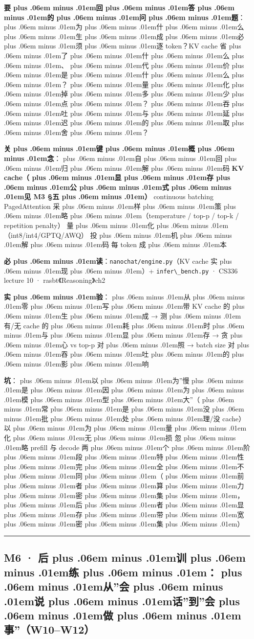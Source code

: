 \documentclass[
]{article}
\newcommand{\passthrough}[1]{#1}
\def\zh#1{{\zhfont #1}}
\def\sym#1{{\symfont #1}}
\def\zhglue{\hskip0pt plus .06em minus .01em}
\begin{document}
\textbf{\zh{要\zhglue 回\zhglue 答\zhglue 的\zhglue 问\zhglue 题}}\zh{：\zhglue 为\zhglue 什\zhglue 么\zhglue 生\zhglue 成\zhglue 必\zhglue 须\zhglue 逐} token\zh{？}KV cache \zh{省\zhglue 了\zhglue 什\zhglue 么\zhglue 、\zhglue 代\zhglue 价\zhglue 是\zhglue 什\zhglue 么\zhglue ？\zhglue 量\zhglue 化\zhglue 掉\zhglue 多\zhglue 少\zhglue 点\zhglue ？\zhglue 吞\zhglue 吐\zhglue 与\zhglue 延\zhglue 迟\zhglue 的\zhglue 取\zhglue 舍\zhglue ？}

\textbf{\zh{关\zhglue 键\zhglue 概\zhglue 念}}\zh{：\zhglue 自\zhglue 回\zhglue 归\zhglue 解\zhglue 码} \textbar{} \textbf{KV cache\zh{（\zhglue 显\zhglue 存\zhglue 公\zhglue 式\zhglue 见} M3 \sym{§}\zh{五\zhglue ）}} \textbar{} continuous batching \textbar{} PagedAttention \textbar{} \zh{采\zhglue 样\zhglue 策\zhglue 略\zhglue （}temperature / top-p / top-k / repetition penalty\zh{）}\textbar{} \zh{量\zhglue 化\zhglue （}int8/int4/GPTQ/AWQ\zh{）}\textbar{} \zh{投\zhglue 机\zhglue 解\zhglue 码} \textbar{} \zh{每} token \zh{成\zhglue 本}

\textbf{\zh{必\zhglue 读}}\zh{：}\passthrough{\lstinline!nanochat/engine.py!}\zh{（}KV cache \zh{实\zhglue 现\zhglue ）}+ \passthrough{\lstinline!infer\_bench.py!} \sym{·} CS336 lecture 10 \sym{·} rasbt\zh{《}Reasoning\zh{》}ch2

\textbf{\zh{实\zhglue 验}}\zh{：\zhglue 从\zhglue 零\zhglue 写\zhglue 带} KV cache \zh{的\zhglue 生\zhglue 成} \sym{→} \zh{测\zhglue 有}/\zh{无} cache \zh{的\zhglue 耗\zhglue 时\zhglue 与\zhglue 显\zhglue 存} \sym{→} \zh{贪\zhglue 心} vs top-p \zh{对\zhglue 照} \sym{→} batch size \zh{对\zhglue 吞\zhglue 吐\zhglue 的\zhglue 影\zhglue 响}

\textbf{\zh{坑}}\zh{：\zhglue 以\zhglue 为}''\zh{慢\zhglue 是\zhglue 因\zhglue 为\zhglue 模\zhglue 型\zhglue 大}''\zh{（\zhglue 常\zhglue 是\zhglue 没\zhglue 批\zhglue 处\zhglue 理}/\zh{没} cache\zh{）}\textbar{} \zh{以\zhglue 为\zhglue 量\zhglue 化\zhglue 无\zhglue 损} \textbar{} \zh{忽\zhglue 略} prefill \zh{与} decode \zh{两\zhglue 个\zhglue 阶\zhglue 段\zhglue 特\zhglue 性\zhglue 完\zhglue 全\zhglue 不\zhglue 同\zhglue （\zhglue 前\zhglue 者\zhglue 算\zhglue 力\zhglue 密\zhglue 集\zhglue ，\zhglue 后\zhglue 者\zhglue 显\zhglue 存\zhglue 带\zhglue 宽\zhglue 密\zhglue 集\zhglue ）}

\begin{center}\rule{0.5\linewidth}{0.5pt}\end{center}

\subsection{M6 \sym{·} \zh{后\zhglue 训\zhglue 练\zhglue ：\zhglue 从}''\zh{会\zhglue 说\zhglue 话}''\zh{到}''\zh{会\zhglue 做\zhglue 事}''\zh{（}W10--W12\zh{）}}\label{m6-ux540eux8badux7ec3ux4eceux4f1aux8bf4ux8bddux5230ux4f1aux505aux4e8bw10w12}
\end{document}
